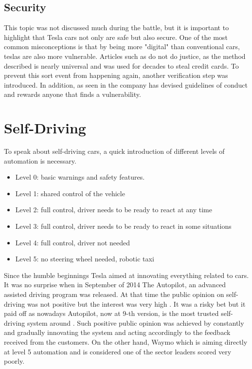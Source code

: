 \documentclass{article} %
\begin{document}
\subsection{Security}
This topic was not discussed much during the battle, but it is important to highlight that Tesla cars not only are safe but also secure.%
\newline One of the most common misconceptions is that by being more "digital" than conventional cars, teslas are also more vulnerable.
Articles such as \cite{Security:Theft} do not do justice, as the method described is nearly universal and was used for decades to steal credit cards.%
To prevent this sort event from happening again, another verification step was introduced.%
\newline In addition, as seen in \cite{Security:Methods} the company has devised guidelines of conduct and rewards anyone that finds a vulnerability.
\section{Self-Driving} %
To speak about self-driving cars, a quick introduction of different levels of automation is necessary.
\begin{itemize}
    \item Level 0: basic warnings and safety features.
    \item Level 1: shared control of the vehicle
    \item Level 2: full control, driver needs to be ready to react at any time
    \item Level 3: full control,  driver needs to be ready to react in some situations
    \item Level 4: full control,  driver not needed
    \item Level 5: no steering wheel needed, robotic taxi
\end{itemize}
Since the humble beginnings Tesla aimed at innovating everything related to cars.%
It was no surprise when in September of 2014 The Autopilot, an advanced assisted driving program was released. At that time the public opinion on self-driving was not positive but the interest was very high \cite{Pilot:Opinion}. It was a risky bet but it paid off as nowadays Autopilot, now at 9-th version, is the most trusted self-driving system around \cite{Pilot:Trust}.%
Such positive public opinion was achieved by constantly and gradually innovating the system and acting accordingly to the feedback received from the customers.
On the other hand, Waymo which is aiming directly at level 5 automation and is considered one of the sector leaders scored very poorly. %
\end{document}
